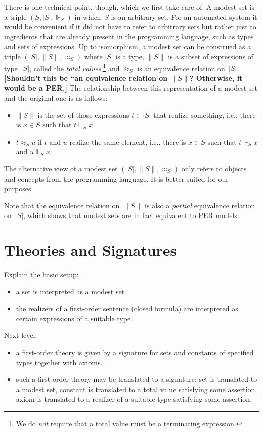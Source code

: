 \documentclass{article}
\newcommand{\ut}[1]{|#1|}
\newcommand{\tot}[1]{\|#1\|}
\newcommand{\per}[1]{\approx_{#1}}
\newcommand{\rz}{\Vdash}
\newcommand{\comment}[1]{\textbf{[#1]}}
\begin{document}
There is one technical point, though, which we first take care of. A
modest set is a triple $(S, \ut{S}, {\rz_S})$ in which~$S$ is an
arbitrary set. For an automated system it would be convenient if it
did not have to refer to arbitrary sets but rather just to ingredients
that are already present in the programming language, such as types
and sets of expressions. Up to isomorphism, a modest set can be
construed as a triple $(\ut{S}, \tot{S}, {\per{S}})$ where $\ut{S}$ is
a type, $\tot{S}$ is a subset of expressions of type~$\ut{S}$, called
the \emph{total values},\footnote{We do \emph{not} require that a
  total value must be a terminating expression.} and $\per{S}$ is an
equivalence relation on~$\ut{S}$.  \comment{Shouldn't this be ``an
  equivalence relation on $\tot{S}$?  Otherwise, it would be a PER.}
The relationship between this representation of a modest set and the
original one is as follows:
%
\begin{itemize}
\item $\tot{S}$ is the set of those expressions $t \in \ut{S}$ that
  realize something, i.e., there is $x \in S$ such that $t \rz_S x$.
\item $t \per{S} u$ if $t$ and $u$ realize the same element, i.e.,
  there is $x \in S$ such that $t \rz_S x$ and $u \rz_S x$.
\end{itemize}
%
The alternative view of a modest set $(\ut{S}, \tot{S}, {\per{S}})$
only refers to objects and concepts from the programming language. It
is better suited for our purposes.

Note that the equivalence relation on~$\tot{S}$ is also a
\emph{partial} equivalence relation on~$\ut{S}$, which shows that
modest sets are in fact equivalent to PER models.


\section{Theories and Signatures}
\label{sec:theories-signatures}

Explain the basic setup:
%
\begin{itemize}
\item a set is interpreted as a modest set
\item the realizers of a first-order sentence (closed formula) are
  interpreted as certain expressions of a suitable type.
\end{itemize}

Next level:
%
\begin{itemize}
\item a first-order theory is given by a signature for sets and
  constants of specified types together with axioms.
\item such a first-order theory may be translated to a signature:
  set is translated to a modest set, constant is translated to a total
  value satisfying some assertion, axiom is translated to a realizer
  of a suitable type satisfying some assertion.
\end{itemize}
\end{document}
